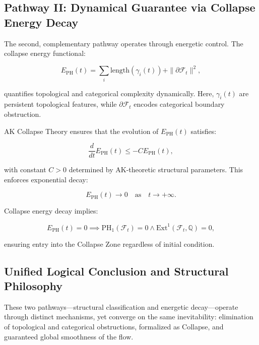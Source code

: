 \documentclass[11pt]{article}
\begin{document}
\subsection{Pathway II: Dynamical Guarantee via Collapse Energy Decay}

The second, complementary pathway operates through energetic control. The collapse energy functional:

\begin{equation}
E_{\mathrm{PH}}(t) = \sum_i \mathrm{length}(\gamma_i(t)) + \|\partial \mathcal{F}_t\|^2,
\end{equation}

quantifies topological and categorical complexity dynamically. Here, $\gamma_i(t)$ are persistent topological features, while $\partial \mathcal{F}_t$ encodes categorical boundary obstruction.

AK Collapse Theory ensures that the evolution of $E_{\mathrm{PH}}(t)$ satisfies:

\begin{equation}
\frac{d}{dt} E_{\mathrm{PH}}(t) \leq -C E_{\mathrm{PH}}(t),
\end{equation}

with constant $C > 0$ determined by AK-theoretic structural parameters. This enforces exponential decay:

\begin{equation}
E_{\mathrm{PH}}(t) \to 0 \quad \text{as} \quad t \to +\infty.
\end{equation}

Collapse energy decay implies:

\begin{equation}
E_{\mathrm{PH}}(t) = 0 \implies \mathrm{PH}_1(\mathcal{F}_t) = 0 \land \mathrm{Ext}^1(\mathcal{F}_t, \mathbb{Q}) = 0,
\end{equation}

ensuring entry into the Collapse Zone regardless of initial condition.

\subsection{Unified Logical Conclusion and Structural Philosophy}

These two pathways---structural classification and energetic decay---operate through distinct mechanisms, yet converge on the same inevitability: elimination of topological and categorical obstructions, formalized as Collapse, and guaranteed global smoothness of the flow.
\end{document}
